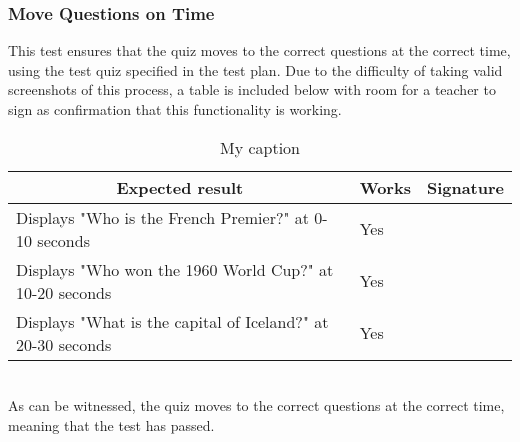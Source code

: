 \subsubsection{Move Questions on Time}
This test ensures that the quiz moves to the correct questions at the correct time, using the test quiz specified in the test plan. Due to the difficulty of taking valid screenshots of this process, a table is included below with room for a teacher to sign as confirmation that this functionality is working.

\begin{table}[]
\centering
\begin{tabular}{|l|l|l|}
\hline
\multicolumn{1}{|c|}{\textbf{Expected result}}              & \multicolumn{1}{c|}{\textbf{Works}} & \multicolumn{1}{c|}{\textbf{Signature}} \\ \hline
Displays "Who is the French Premier?" at 0-10 seconds       & Yes                                 &                                         \\ \hline
Displays "Who won the 1960 World Cup?" at 10-20 seconds     & Yes                                 &                                         \\ \hline
Displays "What is the capital of Iceland?" at 20-30 seconds & Yes                                 &                                         \\ \hline
\end{tabular}
\caption{My caption}
\label{my-label}
\end{table}

\\As can be witnessed, the quiz moves to the correct questions at the correct time, meaning that the test has passed. 
